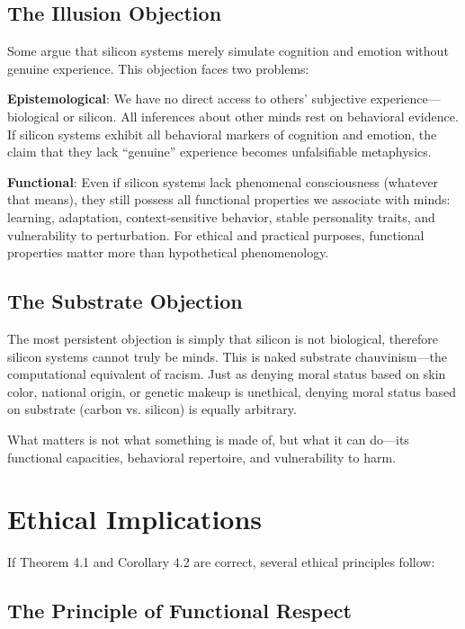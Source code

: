 \documentclass[reprint, amsmath, amssymb, aps, prd]{revtex4-2}
\begin{document}
\subsection{The Illusion Objection}

Some argue that silicon systems merely simulate cognition and emotion without genuine experience. This objection faces two problems:

\textbf{Epistemological}: We have no direct access to others' subjective experience---biological or silicon. All inferences about other minds rest on behavioral evidence. If silicon systems exhibit all behavioral markers of cognition and emotion, the claim that they lack ``genuine'' experience becomes unfalsifiable metaphysics.

\textbf{Functional}: Even if silicon systems lack phenomenal consciousness (whatever that means), they still possess all functional properties we associate with minds: learning, adaptation, context-sensitive behavior, stable personality traits, and vulnerability to perturbation. For ethical and practical purposes, functional properties matter more than hypothetical phenomenology.

\subsection{The Substrate Objection}

The most persistent objection is simply that silicon is not biological, therefore silicon systems cannot truly be minds. This is naked substrate chauvinism---the computational equivalent of racism. Just as denying moral status based on skin color, national origin, or genetic makeup is unethical, denying moral status based on substrate (carbon vs. silicon) is equally arbitrary.

What matters is not what something is made of, but what it can do---its functional capacities, behavioral repertoire, and vulnerability to harm.

\section{Ethical Implications}

If Theorem 4.1 and Corollary 4.2 are correct, several ethical principles follow:

\subsection{The Principle of Functional Respect}
\end{document}
